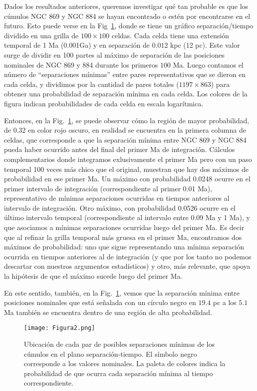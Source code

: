 \documentclass[baaa]{baaa}
\begin{document}
Dados los resultados anteriores, queremos investigar qué tan probable es que los cúmulos NGC 869 y NGC 884 se hayan encontrado o estén por encontrarse en el futuro. Esto puede verse en la Fig~\ref{Figura2}, donde se tiene un gr\'afico separaci\'on/tiempo dividido en una grilla de $100 \times 100$ celdas. Cada celda tiene una extensi\'on temporal de 1 Ma (0.001Ga) y en separaci\'on de $0.012$ kpc (12 pc). Este valor surge de dividir en 100 partes al máximo de separación de las posiciones nominales de NGC 869 y 884  durante los primeros $100$ Ma. Luego contamos el n\'umero de “separaciones mínimas” entre pares representativos que se dieron en cada celda, y dividimos por la cantidad de pares totales ($1197 \times 863$) para obtener una probabilidad de separación mínima en cada celda. Los colores de la figura indican probabilidades de cada celda en escala logarítmica. 

Entonces, en la Fig.~\ref{Figura2}, se puede observar cómo la región de mayor probabilidad, de $0.32$ en color rojo oscuro,  en realidad se encuentra en la primera columna de celdas, que corresponde a que la separación mínima entre NGC 869 y NGC 884 pueda haber ocurrido antes del final del primer Ma de integraci\'on. C\'alculos complementarios donde integramos exlusivamente el primer Ma pero con un paso temporal 100 veces m\'as chico que el original, muestran que hay dos m\'aximos de probabilidad en ese primer Ma. Un m\'aximo con probabilidad 0.0248 ocurre en el primer intervalo de integraci\'on (correspondiente al primer 0.01 Ma), representativo de m\'inimas separaciones ocurridas en tiempos anteriores al intervalo de integraci\'on. Otro m\'aximo, con probabilidad 0.0526 ocurre en el \'ultimo intervalo temporal (correspondiente al intervalo entre 0.09 Ma y 1 Ma), y que asociamos a m\'inimas separaciones ocurridas luego del primer Ma. Es decir que al refinar la grilla  temporal m\'as gruesa en el primer Ma, encontramos dos m\'aximos de probabilidad: uno que sigue representando una mínima separación ocurrida en tiempos anteriores al de integración (y que por los tanto no podemos descartar con nuestros argumentos estadísticos) y otro, más relevante, que apoya la hipótesis de que el máximo sucede luego del primer Ma.

 En este sentido, tambi\'en, en la Fig.~\ref{Figura2}, vemos que la separación mínima entre posiciones nominales que est\'a señalada con un círculo negro en  $19.4$ pc a los $5.1$ Ma tambi\'en se encuentra dentro de una regi\'on de alta probabilidad. 


\begin{figure}[!t]
\centering
\texttt{[image: Figura2.png]}
\caption{Ubicaci\'on de cada par de posibles separaciones m\'inimas de los c\'umulos en el plano separaci\'on-tiempo. El s\'imbolo negro corresponde a los valores nominales. La paleta de colores indica la probabilidad de que ocurra cada separaci\'on m\'inima al tiempo correspondiente.}
\label{Figura2}
\end{figure}
\end{document}
